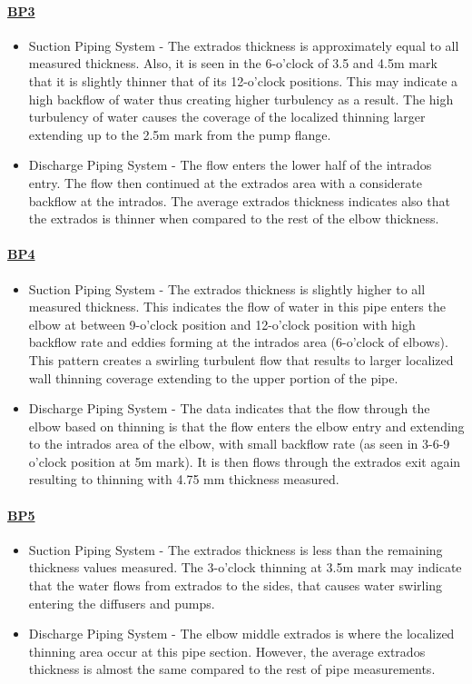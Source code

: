 \paragraph{\underline{BP3}}
\begin{itemize}
	\item Suction Piping System - The extrados thickness is approximately equal to all measured thickness. Also, it is seen in the 6-o'clock of 3.5 and 4.5m mark that it is slightly thinner that of its 12-o'clock positions. This may indicate a high backflow of water thus creating higher turbulency as a result. The high turbulency of water causes the coverage of the localized thinning larger extending up to the 2.5m mark from the pump flange.
	\item	Discharge Piping System - The flow enters the lower half of the intrados entry. The flow then continued at the extrados area with a considerate backflow at the intrados. The average extrados thickness indicates also that the extrados is thinner when compared to the rest of the elbow thickness.
\end{itemize}

\paragraph{\underline{BP4}}
\begin{itemize}
	\item Suction Piping System - The extrados thickness is slightly higher to all measured thickness. This indicates the flow of water in this pipe enters the elbow at between 9-o'clock position and 12-o'clock position with high backflow rate and eddies forming at the intrados area (6-o'clock of elbows). This pattern creates a swirling turbulent flow that results to larger localized wall thinning coverage extending to the upper portion of the pipe.
	\item	Discharge Piping System - The data indicates that the flow through the elbow based on thinning is that the flow enters the elbow entry and extending to the intrados area of the elbow, with small backflow rate (as seen in 3-6-9 o'clock position at 5m mark). It is then flows through the extrados exit again resulting to thinning with 4.75 mm thickness measured.
\end{itemize}

\paragraph{\underline{BP5}}
\begin{itemize}
	\item Suction Piping System - The extrados thickness is less than the remaining thickness values measured. The 3-o'clock thinning at 3.5m mark may indicate that the water flows from extrados to the sides, that causes water swirling entering the diffusers and pumps.
	\item	Discharge Piping System - The elbow middle extrados is where the localized thinning area occur at this pipe section. However, the average extrados thickness is almost the same compared to the rest of pipe measurements.
\end{itemize}

